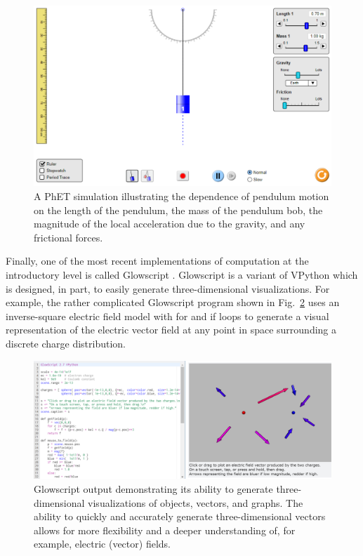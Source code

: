 \documentclass{msuphddissertation}
\begin{document}
\begin{doublespace}
\begin{figure}\center
\includegraphics[scale=0.50]{images/CH2PhET.pdf}
\caption{A PhET simulation illustrating the dependence of pendulum motion on the length of the pendulum, the mass of the pendulum bob, the magnitude of the local acceleration due to the gravity, and any frictional forces.}\label{CH2:PhET}
\end{figure}

Finally, one of the most recent implementations of computation at the introductory level is called Glowscript \cite{Chabay2008}.  Glowscript is a variant of VPython which is designed, in part, to easily generate three-dimensional visualizations.  For example, the rather complicated Glowscript program shown in Fig.~\ref{CH2:Glowscript} uses an inverse-square electric field model with for and if loops to generate a visual representation of the electric vector field at any point in space surrounding a discrete charge distribution. 

\begin{figure}\center
\includegraphics[scale=0.35]{images/CH2Glowscript.pdf}
\caption{Glowscript output demonstrating its ability to generate three-dimensional visualizations of objects, vectors, and graphs.  The ability to quickly and accurately generate three-dimensional vectors allows for more flexibility and a deeper understanding of, for example, electric (vector) fields.}\label{CH2:Glowscript}
\end{figure}


\end{doublespace}
\end{document}
